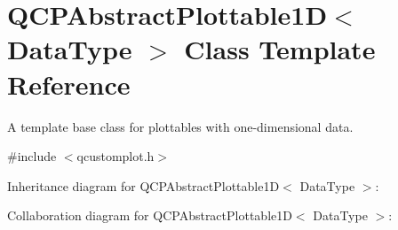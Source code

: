 \hypertarget{class_q_c_p_abstract_plottable1_d}{}\section{Q\+C\+P\+Abstract\+Plottable1D$<$ Data\+Type $>$ Class Template Reference}
\label{class_q_c_p_abstract_plottable1_d}


A template base class for plottables with one-\/dimensional data.  




{\ttfamily \#include $<$qcustomplot.\+h$>$}



Inheritance diagram for Q\+C\+P\+Abstract\+Plottable1D$<$ Data\+Type $>$\+:


Collaboration diagram for Q\+C\+P\+Abstract\+Plottable1D$<$ Data\+Type $>$\+:
